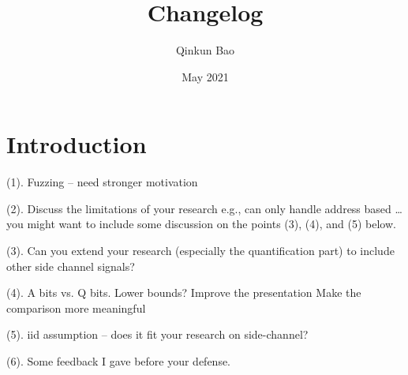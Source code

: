 \documentclass{article}
\title{Changelog}
\author{Qinkun Bao}
\date{May 2021}
\begin{document}
\maketitle

\section{Introduction}
(1). Fuzzing – need stronger motivation

(2). Discuss the limitations of your research
e.g., can only handle address based …
you might want to include some discussion on the points (3), (4), and (5) below.

(3). Can you extend your research (especially the quantification part) to include other side channel signals?

(4). A bits vs. Q bits. Lower bounds?
Improve the presentation
Make the comparison more meaningful


(5). iid assumption – does it fit your research on side-channel?

(6). Some feedback I gave before your defense.
\end{document}
